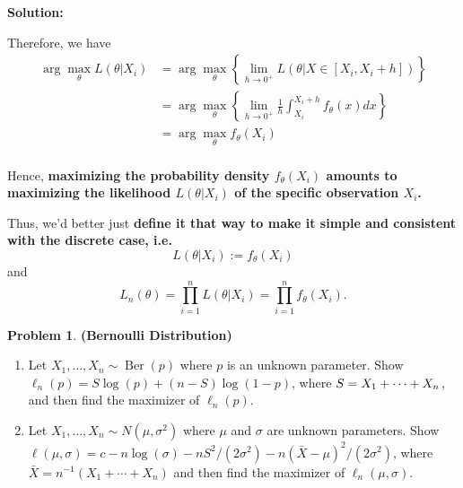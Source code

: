 \documentclass[13pt]{article}
\theoremstyle{definition}
\newtheorem{problem}[theorem]{Problem}
\newenvironment{solution}
{\color{C2}\begin{framed}\begingroup\textbf{Solution:} }
  {\endgroup\end{framed}}
\theoremstyle{remark}
\begin{document}
\begin{solution}
\begin{enumerate}[label=(\alph*),topsep=0pt]
       Therefore, we have
       \begin{align*}\arg\max_{\theta}L(\theta |X_i) &=
      \arg\max_{\theta} \left\{\lim_{h\to 0^+}L(\theta |X\in [X_i, X_i+h])\right\}\\ &= \arg\max_{\theta} \left\{\lim_{h\to 0^+}\frac{1}{h}\int_{X_i}^{X_i+h} f_{\theta}(x)dx\right\}\\
      &= \arg\max_{\theta} f_{\theta}(X_i)\\
       \end{align*}
       
       Hence, \textbf{maximizing the probability density $f_{\theta}(X_i)$ amounts to maximizing the likelihood $L(\theta |X_i)$ of the specific observation $X_i$. }
       
       Thus, we'd better just \textbf{define it that way to make it simple and consistent with the discrete case, i.e.}
       \[
       L(\theta |X_i) := f_{\theta}(X_i)
       \]
       and 
       \[
       L_n(\theta)=\prod_{i=1}^{n} L(\theta |X_i) = \prod_{i=1}^{n} f_\theta(X_i).
       \]
       
    \end{enumerate}
\end{solution}

\begin{problem}\textbf{(Bernoulli Distribution)}
    \begin{enumerate}[label=(\alph*),topsep=0pt]
        \item 
            Let $X_1, \ldots, X_n \sim \operatorname{Ber}(p)$ where $p$ is an unknown parameter.
            Show $\ell_n(p) = S\log(p) + (n-S)\log(1-p)$, where $S = X_1 + \cdots + X_n\mkern1mu$, and then find the maximizer of $\ell_n(p)$.
        \item
            Let $X_1, \ldots, X_n \sim N(\mu,\sigma^2)$ where $\mu$ and $\sigma$ are unknown parameters.
            Show $\ell(\mu,\sigma) =c -n\log(\sigma)-nS^2/(2\sigma^2)-n(\bar{X}-\mu)^2/(2\sigma^2)$, where $\bar{X} = n^{-1}(X_1 + \cdots + X_n)$ and then find the maximizer of $\ell_n(\mu,\sigma)$.

    \end{enumerate}
\end{problem}
\end{document}
